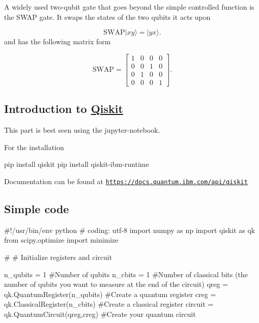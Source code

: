 \documentclass[%
oneside,                 %
final,                   %
10pt]{article}
\begin{document}
A widely used two-qubit gate that goes beyond the simple controlled function is the SWAP gate. It swaps the states of the two qubits it acts upon

\[
\mathrm{SWAP}\vert xy\rangle=\vert yx\rangle.
\]
and has the following matrix form

\[
\mathrm{SWAP}
=\begin{bmatrix}
1 & 0 & 0 & 0 \\
0 & 0 & 1 & 0 \\
0 & 1 & 0 & 0 \\
0 & 0 & 0 & 1
\end{bmatrix}.
\]

\subsection{Introduction to \href{{https://qiskit.org/}}{Qiskit}}

This part is best seen using the jupyter-notebook.

For the installation



\bpycod
pip install qiskit
pip install qiskit-ibm-runtime

\epycod


Documentation can be found at \href{{https://docs.quantum.ibm.com/api/qiskit}}{\nolinkurl{https://docs.quantum.ibm.com/api/qiskit}}

\subsection{Simple code}



















\bpycod
#!/usr/bin/env python
# coding: utf-8
import numpy as np
import qiskit as qk
from scipy.optimize import minimize


# # Initialize registers and circuit

n_qubits = 1 #Number of qubits
n_cbits = 1 #Number of classical bits (the number of qubits you want to measure at the end of the circuit)
qreg = qk.QuantumRegister(n_qubits) #Create a quantum register
creg = qk.ClassicalRegister(n_cbits) #Create a classical register
circuit = qk.QuantumCircuit(qreg,creg) #Create your quantum circuit
\end{document}

